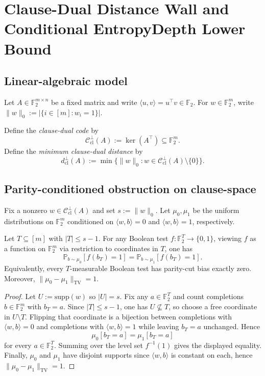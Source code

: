 \section{Clause-Dual Distance Wall and Conditional EntropyDepth Lower Bound}

\subsection{Linear-algebraic model}

Let $A \in \mathbb{F}_2^{m \times n}$ be a fixed matrix and write $\langle u,v\rangle = u^\top v \in \mathbb{F}_2$.
For $w \in \mathbb{F}_2^m$, write $\|w\|_0 := |\{i \in [m] : w_i = 1\}|$.

\begin{definition}
Define the \emph{clause-dual code} by
\[
\mathcal{C}^\perp_{\mathrm{cl}}(A) := \ker(A^\top) \subseteq \mathbb{F}_2^m.
\]
Define the \emph{minimum clause-dual distance} by
\[
d^\perp_{\mathrm{cl}}(A) := \min\{\|w\|_0 : w \in \mathcal{C}^\perp_{\mathrm{cl}}(A)\setminus\{0\}\}.
\]
\end{definition}

\subsection{Parity-conditioned obstruction on clause-space}

Fix a nonzero $w \in \mathcal{C}^\perp_{\mathrm{cl}}(A)$ and set $s := \|w\|_0$.
Let $\mu_0,\mu_1$ be the uniform distributions on $\mathbb{F}_2^m$ conditioned on $\langle w,b\rangle = 0$ and $\langle w,b\rangle = 1$, respectively.

\begin{proposition}
Let $T \subseteq [m]$ with $|T| \le s-1$.
For any Boolean test $f:\mathbb{F}_2^T \to \{0,1\}$, viewing $f$ as a function on $\mathbb{F}_2^m$ via restriction to coordinates in $T$, one has
\[
\mathbb{P}_{b\sim \mu_0}[f(b_T)=1]
=
\mathbb{P}_{b\sim \mu_1}[f(b_T)=1].
\]
Equivalently, every $T$-measurable Boolean test has parity-cut bias exactly zero.
Moreover, $\|\mu_0-\mu_1\|_{\mathrm{TV}}=1$.
\end{proposition}

\begin{proof}
Let $U := \mathrm{supp}(w)$ so $|U|=s$.
Fix any $a \in \mathbb{F}_2^T$ and count completions $b \in \mathbb{F}_2^m$ with $b_T=a$.
Since $|T|\le s-1$, one has $U\not\subseteq T$, so choose a free coordinate in $U\setminus T$.
Flipping that coordinate is a bijection between completions with $\langle w,b\rangle=0$ and completions with $\langle w,b\rangle=1$ while leaving $b_T=a$ unchanged.
Hence
\[
\mu_0[b_T=a]=\mu_1[b_T=a]
\]
for every $a\in\mathbb F_2^T$.
Summing over the level set $f^{-1}(1)$ gives the displayed equality.
Finally, $\mu_0$ and $\mu_1$ have disjoint supports since $\langle w,b\rangle$ is constant on each, hence $\|\mu_0-\mu_1\|_{\mathrm{TV}}=1$.
\end{proof}

